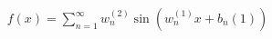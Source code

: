 \documentclass[preview]{standalone}
\begin{document}
\begin{align*}
f(x) =  \sum_{n=1}^{\infty} w_n^{(2)} \sin(w_n^{(1)}x+b_n{(1)})
\end{align*}
\end{document}
